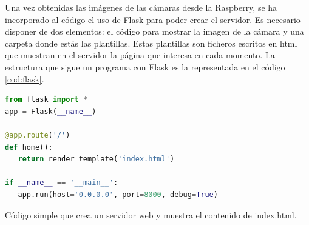 Una vez obtenidas las imágenes de las cámaras desde la Raspberry, se ha incorporado al código el uso de Flask para poder crear el servidor. Es necesario disponer de dos elementos: el código para mostrar la imagen de la cámara y una carpeta donde estás las plantillas. Estas plantillas son ficheros escritos en html que muestran en el servidor la página que interesa en cada momento. La estructura que sigue un programa con Flask es la representada en el código \ref{cod:flask}.\\
\begin{code}[h]
\begin{lstlisting}[language=Python]
from flask import *
app = Flask(__name__)

@app.route('/')
def home():
   return render_template('index.html')

if __name__ == '__main__':
   app.run(host='0.0.0.0', port=8000, debug=True)
\end{lstlisting}
\caption[Código simple que crea un servidor web en el puerto 8000 y muestra el contenido de index.html.]{Código simple que crea un servidor web y muestra el contenido de index.html.}
\label{cod:flask}
\end{code}

